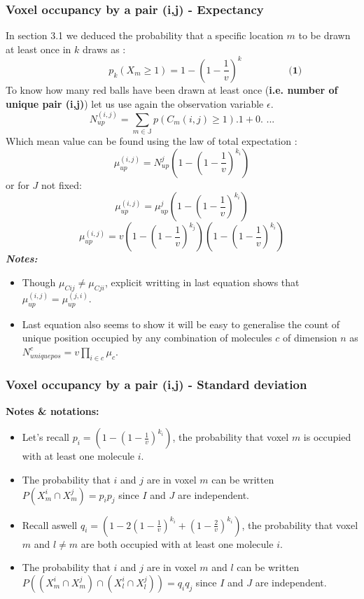 \documentclass{article}
\begin{document}
\subsubsection{Voxel occupancy by a pair (i,j) - Expectancy}
In section 3.1 we deduced the probability that a specific location $m$ to be drawn at least once  in $k$ draws as :
\[
    \hspace{2cm} p_k(X_m \geq 1) = 1-(1 - \frac{1}{v})^k \hspace{2cm} \textbf{(1)}
\]
To know how many red balls have been drawn at least once (\textbf{i.e. number of unique pair (i,j)}) let us use again the observation
variable $\epsilon$.
\[
N^{(i,j)}_{up} = \sum_{m \in \mathbb{J}}p(C_m(i,j) \geq 1).1 + 0. \textbf{ ...}
\]
Which mean value can be found using the law of total expectation :
\begin{equation}
\mu^{(i,j)}_{up} = N^j_{up}(1-(1-\frac{1}{v})^{k_i})
\end{equation}
or for $J$ not fixed:
\[
\mu^{(i,j)}_{up} = \mu^j_{up}(1-(1-\frac{1}{v})^{k_i})
\]
\[
\mu^{(i,j)}_{up} = v(1-(1-\frac{1}{v})^{k_j})(1-(1-\frac{1}{v})^{k_i})
\]
\textit{\textbf{Notes:}}
\begin{itemize}
    \item Though $\mu_{Cij} \neq \mu_{Cji}$, explicit writting in last equation shows that \newline 
    $\mu^{(i,j)}_{up} = \mu^{(j,i)}_{up}$.
    \item Last equation also seems to show it will be easy to generalise the count of unique position occupied by any combination of molecules $c$ of dimension $n$
    as $N^c_{uniquepos} = v\prod_{i \in c}\mu_c$.
\end{itemize}




\subsubsection{Voxel occupancy by a pair (i,j) - Standard deviation}

\textbf{Notes \& notations:}
\begin{itemize}
    \item Let's recall $p_i = (1-{(1-\frac{1}{v})}^{k_i})$, the probability that voxel $m$ is occupied with at least one molecule $i$.
    \item The probability that $i$ and $j$ are in voxel $m$ can be written $P(X^i_m \cap X^j_m) = p_ip_j$ since $I$ and $J$ are independent.
    \item Recall aswell $q_i = (1-2{(1-\frac{1}{v})}^{k_i} + {(1-\frac{2}{v})}^{k_i})$, the probability that voxel $m$ and $l\neq m$ are both occupied with at least
    one molecule $i$.
    \item The probability that $i$ and $j$ are in voxel $m$ and $l$ can be written $P((X^i_m \cap X^j_m) \cap (X^i_l \cap X^j_l)) = q_iq_j$ since $I$ and $J$ are independent.
\end{itemize}
\end{document}
